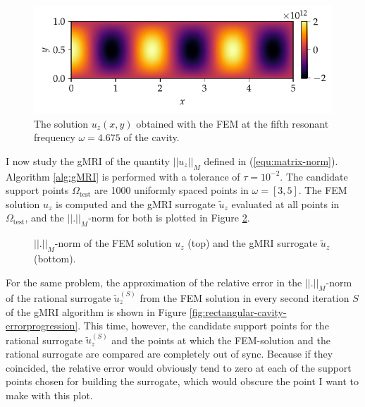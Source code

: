 \documentclass[11pt, a4paper]{article}
\begin{document}
\begin{figure}[ht]
    \centering
    \includegraphics{plots/rectangular_cavity_mode5.pdf}
    \caption{The solution $u_z(x, y)$ obtained with the \acrshort{FEM} at the
    fifth resonant frequency $\omega = 4.675$ of the cavity.}
    \label{fig:rectangular-cavity-mode5}
\end{figure}

I now study the \acrshort{gMRI} of the quantity $||u_z||_M$ defined in
(\ref{equ:matrix-norm}). Algorithm \ref{alg:gMRI} is performed
with a tolerance of $\tau = 10^{-2}$. The candidate support points $\Omega_{\mathrm{test}}$
are 1000 uniformly spaced points in $\omega = [3, 5]$. The \acrshort{FEM} solution $u_z$
is computed and the \acrshort{gMRI} surrogate $\tilde{u}_z$ evaluated at all points in $\Omega_{\mathrm{test}}$,
and the $||.||_M$-norm for both is plotted in Figure \ref{fig:rectangular-cavity-norms}. 

\begin{figure}[ht]
    \centering
    
    \caption{$||.||_M$-norm of the \acrshort{FEM} solution $u_z$ (top) and the 
    \acrshort{gMRI} surrogate $\tilde{u}_z$ (bottom).}
    \label{fig:rectangular-cavity-norms}
\end{figure}

For the same problem, the approximation of the relative error 
in the $||.||_M$-norm of the rational surrogate $\tilde{u}_z^{(S)}$ from the
\acrshort{FEM} solution in every second iteration $S$ of the \acrshort{gMRI} algorithm
is shown in Figure \ref{fig:rectangular-cavity-errorprogression}. This time,
however, the candidate support points for the rational surrogate $\tilde{u}_z^{(S)}$
and the points at which the \acrshort{FEM}-solution and the rational surrogate
are compared are completely out of sync. Because if they coincided, the relative error
would obviously tend to zero at each of the support points chosen for building
the surrogate, which would obscure the point I want to make with this plot.
\end{document}
